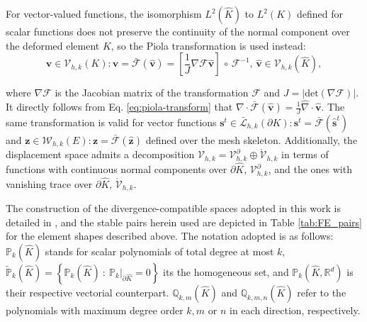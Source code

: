 \documentclass[english,11pt,3p,number,sort&compress]{elsarticle}
\begin{document}
For vector-valued functions, the isomorphism $L^2(\hat{K})$ to $L^2(K)$ defined for scalar functions does not preserve the continuity of the normal component over the deformed element $K$, so the Piola transformation is used instead: 
\begin{equation} \label{eq:piola-transform}
\bm{v} \in \mathcal{V}_{h,k}(K): \bm{v}=\bar{\mathcal{F}}(\bm{\hat{v}})=\left[\frac{1}{J}\nabla\mathcal{F}\bm{\hat{v}} \right] \,\circ\, \mathcal{F}^{-1}, \, \bm{\hat{v}} \in \mathcal{V}_{h,k}(\hat{K}), 
\end{equation}

\noindent where $\nabla\mathcal{F}$ is the Jacobian matrix of the transformation $\mathcal{F}$ and $J=\lvert\text{det}(\nabla\mathcal{F})\lvert$. It directly follows from Eq. \eqref{eq:piola-transform} that $\nabla \cdot \bar{\mathcal{F}}(\bm{\hat{v}})=\frac{1}{J} \hat{\nabla} \cdot \bm{\hat{v}}$. The same transformation is valid for vector functions $\bm{s}^t \in \bar{\mathcal{L}}_{h,k}(\partial K): \bm{s}^t=\bar{\mathcal{F}}(\bm{\hat{s}}^t)$ and $\bm{z} \in \mathcal{W}_{h,k}(E): \bm{z}=\bar{\mathcal{F}}(\bm{\hat{z}})$ defined over the mesh skeleton. Additionally, the displacement space admits a decomposition $\mathcal{V}_{h,k}=\mathcal{V}^\partial_{h,k} \oplus \mathring{\mathcal{V}}_{h,k}$ in terms of functions with continuous normal components over $\partial\hat{K}$, $\mathcal{V}^\partial_{h,k}$, and the ones with vanishing trace over $\partial\hat{K}$, $\mathring{\mathcal{V}}_{h,k}$.

The construction of the divergence-compatible spaces adopted in this work is  detailed in \cite{de2013new,devloo2022efficient}, and the stable pairs herein used are depicted in Table \ref{tab:FE_pairs} for the element shapes described above. The notation adopted is as follows: $\mathbb{P}_k(\hat{K})$ stands for scalar polynomials of total degree at most $k$, $\tilde{\mathbb{P}}_k(\hat{K})=\left\{\mathbb{P}_k(\hat{K}) ~:~\mathbb{P}_k\lvert_{\partial\hat{K}}=0 \right\}$ its the homogeneous set, and $\mathbb{P}_k(\hat{K},\mathbb{R}^d)$ is their respective vectorial counterpart. $\mathbb{Q}_{k,m}(\hat{K})$ and $\mathbb{Q}_{k,m,n}(\hat{K})$ refer to the polynomials with maximum degree order $k,m$ or $n$ in each direction, respectively.
\end{document}
